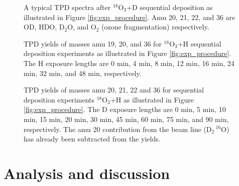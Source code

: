 \documentclass[iop]{emulateapj}
\begin{document}
\begin{figure}
\caption{A typical TPD spectra after $^{18}$O$_3$+D sequential deposition as illustrated in Figure \ref{fig:exp_procedure}. Amu 20, 21, 22, and 36 are OD,  HDO, D$_2$O, and O$_2$ (ozone fragmentation) respectively.}
\label{fig:plot_hiden}
\end{figure}

\begin{figure}
\caption{TPD yields of masses amu 19, 20, and 36 for $^{18}$O$_3$+H sequential deposition experiments as illustrated in Figure \ref{fig:exp_procedure}. The H exposure lengths are 0 min, 4 min, 8 min, 12 min, 16 min, 24 min, 32 min, and 48 min, respectively.}
\label{fig:H_O3}
\end{figure}


\begin{figure}
\caption{TPD yields of masses amu 20, 21, 22 and 36 for sequential deposition experiments $^{18}$O$_3$+H as illustrated in Figure \ref{fig:exp_procedure}. The D exposure lengths are 0 min, 5 min, 10 min, 15 min, 20 min, 30 min, 45 min, 60 min, 75 min, and 90 min, respectively. The amu 20 contribution from the beam line (D$_2\,^{16}$O) has already been subtracted from the yields.}
\label{fig:D_O3}
\end{figure}





\section{Analysis and discussion}
\label{sec:analysis}
\end{document}
